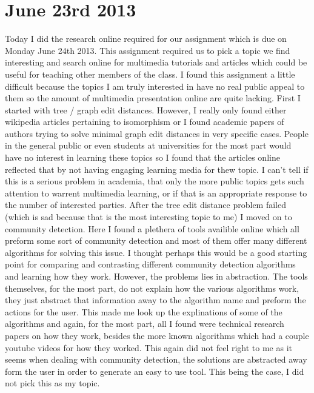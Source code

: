 \documentclass[conference]{IEEEtran}
\begin{document}
\section{June 23rd 2013}
Today I did the research online required for our assignment which is due on Monday June 24th 2013. This
assignment required us to pick a topic we find interesting and search online for multimedia tutorials 
and articles which could be useful for teaching other members of the class. I found this assignment
a little difficult because the topics I am truly interested in have no real public appeal to them so
the amount of multimedia presentation online are quite lacking. First I started with tree / graph edit
distances. However, I really only found either wikipedia articles pertaining to isomorphism or I found
academic papers of authors trying to solve minimal graph edit distances in very specific cases. People
in the general public or even students at universities for the most part would have no interest in
learning these topics so I found that the articles online reflected that by not having engaging learning
media for thew topic. I can't tell if this is a serious problem in academia, that only the more public
topics gets such attention to warrent multimedia learning, or if that is an appropriate response to the
number of interested parties. After the tree edit distance problem failed (which is sad because that is
the most interesting topic to me) I moved on to community detection. Here I found a plethera of tools 
availible online which all preform some sort of community detection and most of them offer many 
different algorithms for solving this issue. I thought perhaps this would be a good starting point for
comparing and contrasting different community detection algorithms and learning how they work. However,
the problems lies in abstraction. The tools themselves, for the most part, do not explain how the various
algorithms work, they just abstract that information away to the algorithm name and preform the actions
for the user. This made me look up the explinations of some of the algorithms and again, for the most part,
all I found were technical research papers on how they work, besides the more known algorithms which had
a couple youtube videos for how they worked. This again did not feel right to me as it seems when dealing
with community detection, the solutions are abstracted away form the user in order to generate an 
easy to use tool. This being the case, I did not pick this as my topic. 
\end{document}
